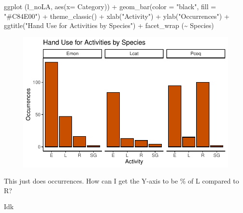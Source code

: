 \documentclass[
  letterpaper,
  DIV=11,
  numbers=noendperiod]{scrartcl}
\newenvironment{Shaded}{\begin{snugshade}}{\end{snugshade}}
\newcommand{\AttributeTok}[1]{\textcolor[rgb]{0.40,0.45,0.13}{#1}}
\newcommand{\FunctionTok}[1]{\textcolor[rgb]{0.28,0.35,0.67}{#1}}
\newcommand{\NormalTok}[1]{\textcolor[rgb]{0.00,0.23,0.31}{#1}}
\newcommand{\SpecialCharTok}[1]{\textcolor[rgb]{0.37,0.37,0.37}{#1}}
\newcommand{\StringTok}[1]{\textcolor[rgb]{0.13,0.47,0.30}{#1}}
\begin{document}
\begin{Shaded}
\begin{Highlighting}[]
\FunctionTok{ggplot}\NormalTok{ (l\_noLA, }\FunctionTok{aes}\NormalTok{(}\AttributeTok{x=}\NormalTok{ Category)) }\SpecialCharTok{+}
  \FunctionTok{geom\_bar}\NormalTok{(}\AttributeTok{color =} \StringTok{"black"}\NormalTok{, }\AttributeTok{fill =} \StringTok{"\#C84E00"}\NormalTok{) }\SpecialCharTok{+}
  \FunctionTok{theme\_classic}\NormalTok{() }\SpecialCharTok{+}
  \FunctionTok{xlab}\NormalTok{(}\StringTok{"Activity"}\NormalTok{) }\SpecialCharTok{+}
  \FunctionTok{ylab}\NormalTok{(}\StringTok{"Occurrences"}\NormalTok{) }\SpecialCharTok{+}
  \FunctionTok{ggtitle}\NormalTok{(}\StringTok{"Hand Use for Activities by Species"}\NormalTok{) }\SpecialCharTok{+}
  \FunctionTok{facet\_wrap}\NormalTok{ (}\SpecialCharTok{\textasciitilde{}}\NormalTok{ Species)}
\end{Highlighting}
\end{Shaded}

\begin{figure}[H]

{\centering \includegraphics{LeftyLemurs_files/figure-pdf/unnamed-chunk-34-1.pdf}

}

\end{figure}

This just does occurrences. How can I get the Y-axis to be \% of L
compared to R?

Idk
\end{document}
